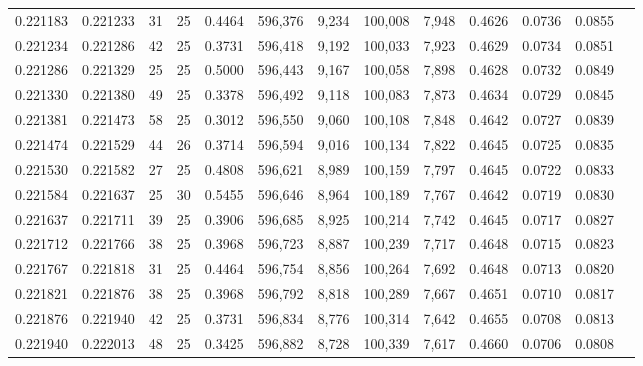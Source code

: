 \begin{tabular}{rrrrrrrrrrrrr}
0.221183 & 0.221233 &  31 &  25 &                                     0.4464 & 596,376 &   9,234 & 100,008 &   7,948 & 0.4626 & 0.0736 & 0.0855 \\
0.221234 & 0.221286 &  42 &  25 &                                     0.3731 & 596,418 &   9,192 & 100,033 &   7,923 & 0.4629 & 0.0734 & 0.0851 \\
0.221286 & 0.221329 &  25 &  25 &                                     0.5000 & 596,443 &   9,167 & 100,058 &   7,898 & 0.4628 & 0.0732 & 0.0849 \\
0.221330 & 0.221380 &  49 &  25 &                                     0.3378 & 596,492 &   9,118 & 100,083 &   7,873 & 0.4634 & 0.0729 & 0.0845 \\
0.221381 & 0.221473 &  58 &  25 &                                     0.3012 & 596,550 &   9,060 & 100,108 &   7,848 & 0.4642 & 0.0727 & 0.0839 \\
0.221474 & 0.221529 &  44 &  26 &                                     0.3714 & 596,594 &   9,016 & 100,134 &   7,822 & 0.4645 & 0.0725 & 0.0835 \\
0.221530 & 0.221582 &  27 &  25 &                                     0.4808 & 596,621 &   8,989 & 100,159 &   7,797 & 0.4645 & 0.0722 & 0.0833 \\
0.221584 & 0.221637 &  25 &  30 &                                     0.5455 & 596,646 &   8,964 & 100,189 &   7,767 & 0.4642 & 0.0719 & 0.0830 \\
0.221637 & 0.221711 &  39 &  25 &                                     0.3906 & 596,685 &   8,925 & 100,214 &   7,742 & 0.4645 & 0.0717 & 0.0827 \\
0.221712 & 0.221766 &  38 &  25 &                                     0.3968 & 596,723 &   8,887 & 100,239 &   7,717 & 0.4648 & 0.0715 & 0.0823 \\
0.221767 & 0.221818 &  31 &  25 &                                     0.4464 & 596,754 &   8,856 & 100,264 &   7,692 & 0.4648 & 0.0713 & 0.0820 \\
0.221821 & 0.221876 &  38 &  25 &                                     0.3968 & 596,792 &   8,818 & 100,289 &   7,667 & 0.4651 & 0.0710 & 0.0817 \\
0.221876 & 0.221940 &  42 &  25 &                                     0.3731 & 596,834 &   8,776 & 100,314 &   7,642 & 0.4655 & 0.0708 & 0.0813 \\
0.221940 & 0.222013 &  48 &  25 &                                     0.3425 & 596,882 &   8,728 & 100,339 &   7,617 & 0.4660 & 0.0706 & 0.0808 \\

\end{tabular}
